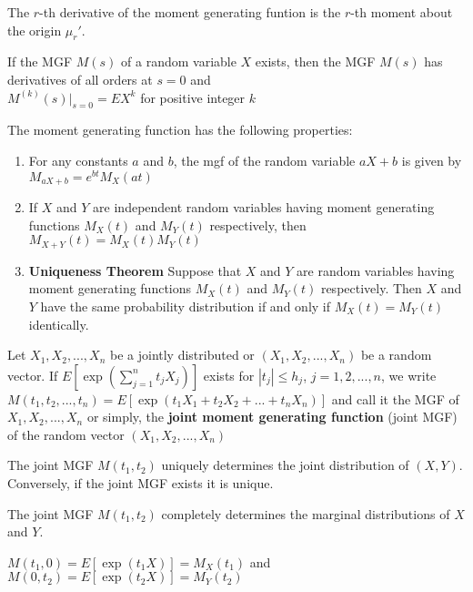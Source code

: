 \begin{samepage}
The $r$-th derivative of the moment generating funtion is the $r$-th moment about the origin $\mu_r '$.
\begin{thm}
    If the MGF $M(s)$ of a random variable $X$ exists, then the MGF $M(s)$ has derivatives of all orders at $s=0$ and \\

    $M^{(k)} (s) |_{s=0} = EX^k$ for positive integer $k$
\end{thm}

\end{samepage}
\begin{thm}
    The moment generating function has the following properties:
    \begin{enumerate}
        \item For any constants $a$ and $b$, the mgf of the random variable $a X + b$ is given by $M_{aX+b} = e^{bt} M_X(at)$
        \item If $X$ and $Y$ are independent random variables having moment generating functions $M_X(t)$ and $M_Y(t)$ respectively, then $M_{X+Y}(t) = M_X(t) M_Y(t)$
        \item \textbf{Uniqueness Theorem} Suppose that $X$ and $Y$ are random variables having moment generating functions $M_X(t)$ and $M_Y(t)$ respectively. Then $X$ and $Y$ have the same probability distribution if and only if $M_X(t) = M_Y(t)$ identically.
    \end{enumerate}
\end{thm}

\begin{defn}
    Let $X_1, X_2, ..., X_n$ be a jointly distributed or $(X_1, X_2, ..., X_n)$ be a random vector. If $E[\exp ( \sum_{j=1}^n t_j X_j )]$ exists for $|t_j| \leq h_j$, $j = 1, 2, ...,n$, we write $M(t_1, t_2, ..., t_n) = E[\exp(t_1 X_1 + t_2 X_2 + ... + t_n X_n)]$ and call it the MGF of $X_1, X_2, ..., X_n$ or simply, the \textbf{joint moment generating function} (joint MGF) of the random vector $(X_1, X_2, ..., X_n)$
\end{defn}

\begin{thm}
    The joint MGF $M(t_1, t_2)$ uniquely determines the joint distribution of $(X, Y)$.
    Conversely, if the joint MGF exists it is unique.
\end{thm}

\begin{thm}
    The joint MGF $M(t_1, t_2)$ completely determines the marginal distributions of $X$ and $Y$.

    $M(t_1, 0) = E[\exp(t_1 X)] = M_X (t_1)$ and $M(0, t_2) = E[\exp(t_2 X)] = M_Y(t_2)$
\end{thm}

